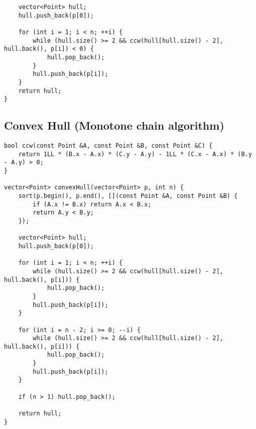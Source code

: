 \documentclass[11pt,a4paper]{article}
\begin{document}
\begin{multicols*}{2}
\begin{lstlisting}
    vector<Point> hull;
    hull.push_back(p[0]);

    for (int i = 1; i < n; ++i) {
        while (hull.size() >= 2 && ccw(hull[hull.size() - 2], hull.back(), p[i]) < 0) {
            hull.pop_back();
        }
        hull.push_back(p[i]);
    }
    return hull;
}
\end{lstlisting}

\subsection{Convex Hull (Monotone chain algorithm)}
\begin{lstlisting}
bool ccw(const Point &A, const Point &B, const Point &C) {
    return 1LL * (B.x - A.x) * (C.y - A.y) - 1LL * (C.x - A.x) * (B.y - A.y) > 0;
}

vector<Point> convexHull(vector<Point> p, int n) {
    sort(p.begin(), p.end(), [](const Point &A, const Point &B) {
        if (A.x != B.x) return A.x < B.x;
        return A.y < B.y;
    });

    vector<Point> hull;
    hull.push_back(p[0]);

    for (int i = 1; i < n; ++i) {
        while (hull.size() >= 2 && ccw(hull[hull.size() - 2], hull.back(), p[i])) {
            hull.pop_back();
        }
        hull.push_back(p[i]);
    }

    for (int i = n - 2; i >= 0; --i) {
        while (hull.size() >= 2 && ccw(hull[hull.size() - 2], hull.back(), p[i])) {
            hull.pop_back();
        }
        hull.push_back(p[i]);
    }

    if (n > 1) hull.pop_back();

    return hull;
}
\end{lstlisting}


\end{multicols*}
\end{document}
